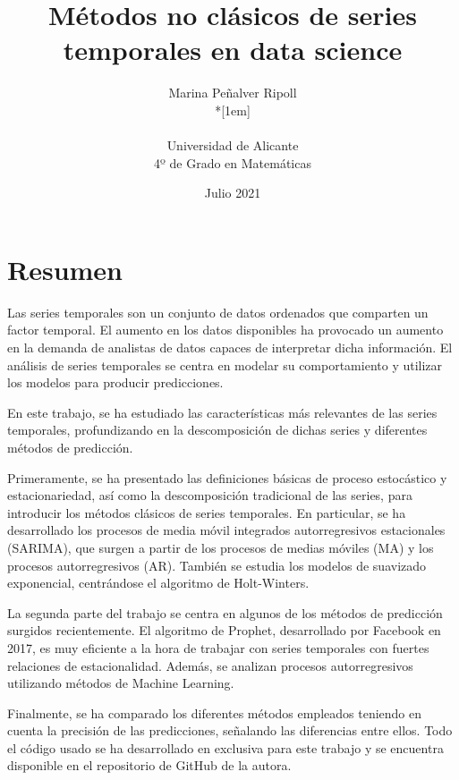 \documentclass[12pt,twoside]{article}
\title{Métodos no clásicos de series temporales en data science}
\author{Marina Peñalver Ripoll\\*[1em]
\begin{minipage}{0.75\textwidth}
\footnotesize \itshape
\begin{center}
Universidad de Alicante \\
4º de Grado en Matemáticas
\end{center}
\end{minipage}
}
\date{Julio 2021}
\begin{document}









\section*{Resumen}
Las series temporales son un conjunto de datos ordenados que comparten un factor temporal. El aumento en los datos disponibles ha provocado un aumento en la demanda de analistas de datos capaces de interpretar dicha información. El análisis de series temporales se centra en modelar su comportamiento y utilizar los modelos para producir predicciones. 

En este trabajo, se ha estudiado las características más relevantes de las series temporales, profundizando en la descomposición de dichas series y diferentes métodos de predicción. 

Primeramente, se ha presentado las definiciones básicas de proceso estocástico y estacionariedad, así como la descomposición tradicional de las series, para introducir los métodos clásicos de series temporales. En particular, se ha desarrollado los procesos de media móvil integrados autorregresivos estacionales (SARIMA), que surgen a partir de los procesos de medias móviles (MA) y los procesos autorregresivos (AR). También se estudia los modelos de suavizado exponencial, centrándose el algoritmo de Holt-Winters. 

La segunda parte del trabajo se centra en algunos de los métodos de predicción surgidos recientemente. El algoritmo de Prophet, desarrollado por Facebook en 2017, es muy eficiente a la hora de trabajar con series temporales con fuertes relaciones de estacionalidad. Además, se analizan procesos autorregresivos utilizando métodos de Machine Learning.

Finalmente, se ha comparado los diferentes métodos empleados teniendo en cuenta la precisión de las predicciones, señalando las diferencias entre ellos. Todo el código usado se ha desarrollado en exclusiva para este trabajo y se encuentra disponible en el repositorio de GitHub de la autora.

\end{document}
